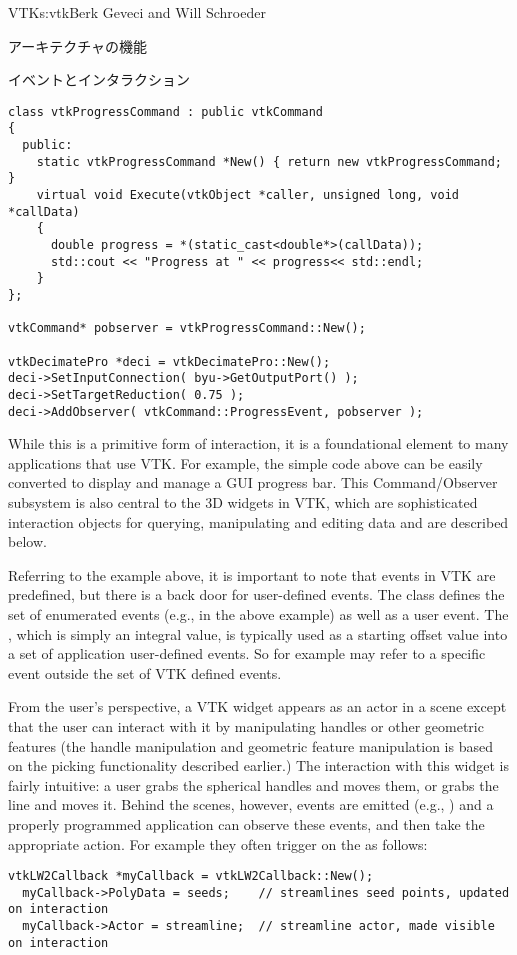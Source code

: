 \begin{aosachapter}{VTK}{s:vtk}{Berk Geveci and Will Schroeder}
\begin{aosasect1}{アーキテクチャの機能}
\begin{aosasect2}{イベントとインタラクション}
\begin{verbatim}
class vtkProgressCommand : public vtkCommand
{
  public:
    static vtkProgressCommand *New() { return new vtkProgressCommand; }
    virtual void Execute(vtkObject *caller, unsigned long, void *callData)
    {
      double progress = *(static_cast<double*>(callData));
      std::cout << "Progress at " << progress<< std::endl;
    }
};

vtkCommand* pobserver = vtkProgressCommand::New();

vtkDecimatePro *deci = vtkDecimatePro::New();
deci->SetInputConnection( byu->GetOutputPort() );
deci->SetTargetReduction( 0.75 );
deci->AddObserver( vtkCommand::ProgressEvent, pobserver );
\end{verbatim}

While this is a primitive form of interaction, it is a foundational
element to many applications that use VTK\@. For example, the simple
code above can be easily converted to display and manage a GUI
progress bar. This Command/Observer subsystem is also central to the
3D widgets in VTK, which are sophisticated interaction objects for
querying, manipulating and editing data and are described below.

Referring to the example above, it is important to note that events in
VTK are predefined, but there is a back door for user-defined
events. The class  defines the set of enumerated
events (e.g.,  in the above example)
as well as a user event. The , which is simply an integral
value, is typically used as a starting offset value into a set of
application user-defined events. So for example
 may refer to a specific event outside
the set of VTK defined events.

From the user's perspective, a VTK widget appears as an actor in a
scene except that the user can interact with it by manipulating
handles or other geometric features (the handle manipulation and
geometric feature manipulation is based on the picking functionality
described earlier.) The interaction with this widget is fairly
intuitive: a user grabs the spherical handles and moves them, or grabs
the line and moves it. Behind the scenes, however, events are emitted
(e.g., ) and a properly programmed application
can observe these events, and then take the appropriate action. For
example they often trigger on the 
as follows:

\begin{verbatim}
vtkLW2Callback *myCallback = vtkLW2Callback::New();
  myCallback->PolyData = seeds;    // streamlines seed points, updated on interaction
  myCallback->Actor = streamline;  // streamline actor, made visible on interaction


\end{verbatim}
\end{aosasect2}
\end{aosasect1}
\end{aosachapter}
